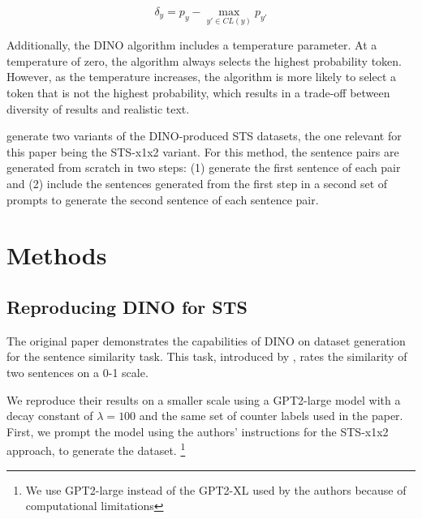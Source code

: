 \documentclass[11pt]{article}
\begin{document}
\begin{equation}
\label{eq:1}
\delta_y = p_y - \max_{y' \in CL(y)} p_{y'}
\end{equation}

Additionally, the DINO algorithm includes a temperature parameter. At a temperature of zero, the algorithm always selects the highest probability token. However, as the temperature increases, the algorithm is more likely to select a token that is not the highest probability, which results in a trade-off between diversity of results and realistic text.

\citet{schick2021generating} generate two variants of the DINO-produced STS datasets, the one relevant for this paper being the STS-x1x2 variant. For this method, the sentence pairs are generated from scratch in two steps: (1) generate the first sentence of each pair and (2) include the sentences generated from the first step in a second set of prompts to generate the second sentence of each sentence pair.



\section{Methods}

\subsection{Reproducing DINO for STS}

The original paper demonstrates the capabilities of DINO on dataset generation for the sentence similarity task. This task, introduced by \citet{agirre2012semeval}, rates the similarity of two sentences on a 0-1 scale.

We reproduce their results on a smaller scale using a GPT2-large model with a decay constant of $\lambda = 100$ and the same set of counter labels used in the paper. First, we prompt the model using the authors' instructions for the STS-x1x2 approach, to generate the dataset. \footnote{We use GPT2-large instead of the GPT2-XL used by the authors because of computational limitations} 
\end{document}
